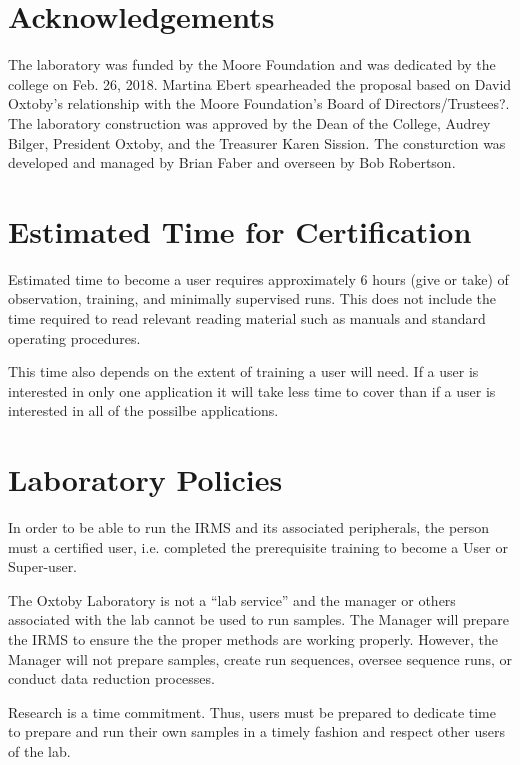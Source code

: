 \documentclass[12pt]{../SOP3_beta}\usepackage[]{graphicx}\usepackage[]{color}
\begin{document}
\newpage
\section{Acknowledgements}

The laboratory was funded by the Moore Foundation and was dedicated by the college on Feb. 26, 2018. Martina Ebert spearheaded the proposal based on David Oxtoby's relationship with the Moore Foundation's Board of Directors/Trustees?. The laboratory construction was approved by the Dean of the College, Audrey Bilger, President Oxtoby, and the Treasurer Karen Sission. The consturction was developed and managed by Brian Faber and overseen by Bob Robertson.

\section{Estimated Time for Certification}

\NP Estimated time to become a user requires approximately 6 hours (give or take) of observation, training, and minimally supervised runs. This does not include the time required to read relevant reading material such as manuals and standard operating procedures.

\NP This time also depends on the extent of training a user will need. If a user is interested in only one application it will take less time to cover than if a user is interested in all of the possilbe applications.

\section{Laboratory Policies}

\NP In order to be able to run the IRMS and its associated peripherals, the person must a certified user, i.e. completed the prerequisite training to become a User or Super-user. 

\NP The Oxtoby Laboratory is not a ``lab service'' and the manager or others associated with the lab cannot be used to run samples. The Manager will prepare the IRMS to ensure the the proper methods are working properly. However, the Manager will not prepare samples, create run sequences, oversee sequence runs, or conduct data reduction processes. 

\NP Research is a time commitment. Thus, users must be prepared to dedicate time to prepare and run their own samples in a timely fashion and respect other users of the lab.
\end{document}
